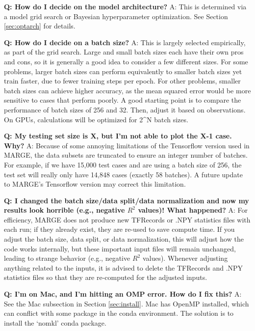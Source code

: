 \documentclass[letterpaper, 12pt]{article}
\begin{document}
\noindent \textbf{Q: How do I decide on the model architecture?} A: This is 
determined via a model grid search or Bayesian hyperparameter optimization.  
See Section \ref{sec:optarch} for details. \newline

\noindent \textbf{Q: How do I decide on a batch size?} A: This is largely 
selected empirically, as part of the grid search.  
Large and small batch sizes each have their own pros 
and cons, so it is generally a good idea to consider a few different sizes.  
For some problems, larger batch 
sizes can perform equivalently to smaller batch sizes yet train faster, due 
to fewer training steps per epoch.  For other problems, smaller batch sizes 
can achieve higher accuracy, as the mean squared error would be more sensitive 
to cases that perform poorly.  A good starting point is to compare the 
performance of batch sizes of 256 and 32.  Then, adjust it based on 
observations.  On GPUs, calculations will be optimized for 2\^{}N batch 
sizes.\newline

\noindent \textbf{Q: My testing set size is X, but I'm not able to plot 
the X-1 case.  Why?}  A: Because of some annoying limitations of the Tensorflow 
version used in MARGE, the data subsets are truncated to ensure an integer 
number of batches.  For example, if we have 15,000 test cases and are using a 
batch size of 256, the test set will really only have 14,848 cases (exactly 58 
batches).  A future update to MARGE's Tensorflow version may correct this 
limitation. \newline

\noindent \textbf{Q: I changed the batch size/data split/data normalization 
and now my results look horrible (e.g., negative $R^2$ values)!  What 
happened?}  A: For efficiency, MARGE 
does not produce new TFRecords or .NPY statistics files with each run; if 
they already exist, they are re-used to save compute time.  If you adjust the 
batch size, data split, or data normalization, this will adjust how the code 
works internally, but these important input files will remain unchanged, leading 
to strange behavior (e.g., negative $R^2$ values).  Whenever adjusting anything 
related to the inputs, it is advised to delete the TFRecords and .NPY statistics
files so that they are re-computed for the adjusted inputs. \newline

\noindent \textbf{Q: I'm on Mac, and I'm hitting an OMP error.  How do 
I fix this?}  A: See the Mac subsection in Section \ref{sec:install}.  Mac has 
OpenMP installed, which can conflict with some package in the conda 
environment.  The solution is to install the `nomkl' conda package.  \newline
\end{document}
